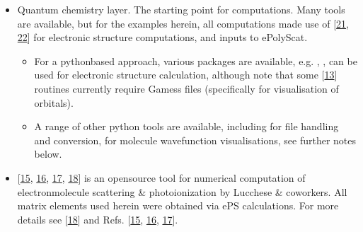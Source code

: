 \documentclass[letterpaper,table,10pt,english]{jupyterBook}
\begin{document}
\begin{itemize}
\item {} 
\sphinxAtStartPar
Quantum chemistry layer. The starting point for  computations. Many tools are available, but for the examples herein, all computations made use of  {[}\hyperlink{cite.backmatter/bibliography:id561}{21}, \hyperlink{cite.backmatter/bibliography:id572}{22}{]} for electronic structure computations, and inputs to ePolyScat.
\begin{itemize}
\item {} 
\sphinxAtStartPar
For a python\sphinxhyphen{}based approach, various packages are available, e.g. , ,  can be used for electronic structure calculation, although note that some  {[}\hyperlink{cite.backmatter/bibliography:id547}{13}{]} routines currently require Gamess files (specifically for visualisation of orbitals).

\item {} 
\sphinxAtStartPar
A range of other python tools are available, including  for file handling and conversion,  for molecule wavefunction visualisations, see further notes below.

\end{itemize}

\item {} 
\sphinxAtStartPar
{} {[}\hyperlink{cite.backmatter/bibliography:id693}{15}, \hyperlink{cite.backmatter/bibliography:id567}{16}, \hyperlink{cite.backmatter/bibliography:id725}{17}, \hyperlink{cite.backmatter/bibliography:id696}{18}{]} is an open\sphinxhyphen{}source tool for numerical computation of electron\sphinxhyphen{}molecule scattering \& photoionization by Lucchese \& coworkers. All matrix elements used herein were obtained via ePS calculations. For more details see  {[}\hyperlink{cite.backmatter/bibliography:id696}{18}{]} and Refs. {[}\hyperlink{cite.backmatter/bibliography:id693}{15}, \hyperlink{cite.backmatter/bibliography:id567}{16}, \hyperlink{cite.backmatter/bibliography:id725}{17}{]}.


\end{itemize}
\end{document}
